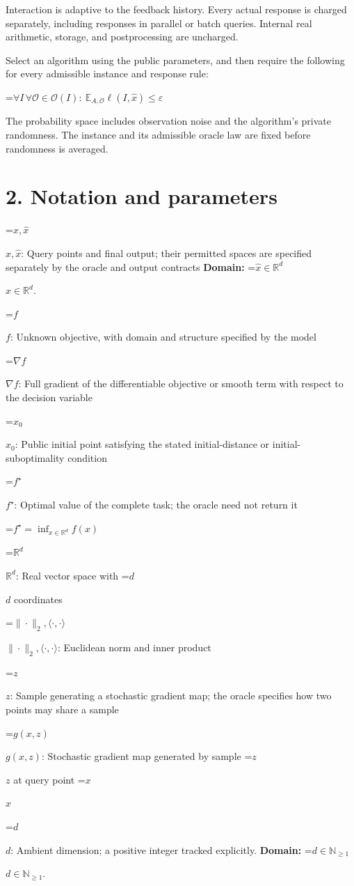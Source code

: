 \documentclass[10pt,a4paper]{article}
\newcommand{\AtlasMath}[1]{\par\begingroup\centering\setbox0=\hbox{$\displaystyle #1$}\ifdim\wd0>1.4\linewidth\typeout{ATLAS WIDE FORMULA: \the\wd0}\fi\ifdim\wd0>\linewidth\resizebox{\linewidth}{!}{\box0}\else\box0\fi\par\endgroup}
\newcommand{\AtlasInlineMath}[1]{\begingroup\setbox0=\hbox{$#1$}\ifdim\wd0>.4\linewidth\endgroup\AtlasMath{#1}\else\endgroup$#1$\fi}
\begin{document}
Interaction is adaptive to the feedback history. Every actual response is charged separately, including responses in parallel or batch queries. Internal real arithmetic, storage, and postprocessing are uncharged.

Select an algorithm using the public parameters, and then require the following for every admissible instance and response rule:


\AtlasMath{\forall I\,\forall\mathcal{O}\in\mathcal{O}(I):\ \mathbb{E}_{A,\mathcal{O}}\ell(I,\widehat{x})\le\varepsilon}


The probability space includes observation noise and the algorithm's private randomness. The instance and its admissible oracle law are fixed before randomness is averaged.

\section{2. Notation and parameters}
\AtlasInlineMath{x,\widehat{x}}: Query points and final output; their permitted spaces are specified separately by the oracle and output contracts \textbf{Domain:} \AtlasInlineMath{\widehat{x}\in \mathbb{R}^d}.

\AtlasInlineMath{f}: Unknown objective, with domain and structure specified by the model

\AtlasInlineMath{\nabla f}: Full gradient of the differentiable objective or smooth term with respect to the decision variable

\AtlasInlineMath{x_0}: Public initial point satisfying the stated initial-distance or initial-suboptimality condition

\AtlasInlineMath{f^\star}: Optimal value of the complete task; the oracle need not return it


\AtlasMath{f^\star=\inf_{x\in \mathbb{R}^d}f(x)}


\AtlasInlineMath{\mathbb{R}^d}: Real vector space with \AtlasInlineMath{d} coordinates

\AtlasInlineMath{\|\cdot\|_2,\langle\cdot,\cdot\rangle}: Euclidean norm and inner product

\AtlasInlineMath{z}: Sample generating a stochastic gradient map; the oracle specifies how two points may share a sample

\AtlasInlineMath{g(x,z)}: Stochastic gradient map generated by sample \AtlasInlineMath{z} at query point \AtlasInlineMath{x}

\AtlasInlineMath{d}: Ambient dimension; a positive integer tracked explicitly. \textbf{Domain:} \AtlasInlineMath{d\in\mathbb{N}_{\ge1}}.
\end{document}
